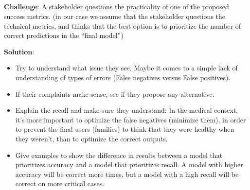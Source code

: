 \subsection*{}
\begin{warning}
    \textbf{Challenge}: A stakeholder questions the practicality of one of the proposed success metrics.
    (in our case we assume that the stakeholder questions the technical metrics,
    and thinks that the best option is to prioritize the number of correct predictions in the “final model”)

    \textbf{Solution}:

    \begin{itemize}
        \item Try to understand what issue they see.
        Maybe it comes to a simple lack of understanding of types of errors (False negatives versus False positives).
        \item If their complaints make sense, see if they propose any alternative.
        \item Explain the recall and make sure they understand: In the medical context,
        it’s more important to optimize the false negatives (minimize them),
        in order to prevent the final users (families) to think that they were healthy when they weren’t, than to optimize the correct outputs.
        \item Give examples to show the difference in results between a model that prioritizes accuracy and a model that prioritizes recall.
        A model with higher accuracy will be correct more times, but a model with a high recall will be correct on more critical cases.
    \end{itemize}


\end{warning}